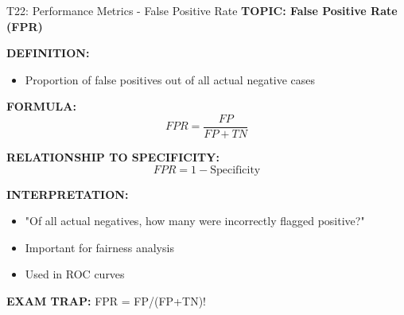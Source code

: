\documentclass[8pt]{beamer}
\begin{document}
	\begin{frame}{T22: Performance Metrics - False Positive Rate}
		\fontsize{6.5}{7.5}\selectfont
		\textbf{TOPIC: False Positive Rate (FPR)}
		
		\vspace{0.1cm}
		\textbf{DEFINITION:}
		\begin{itemize}
			\item Proportion of false positives out of all actual negative cases
		\end{itemize}
		
		\vspace{0.1cm}
		\textbf{FORMULA:}
		\[
		FPR = \frac{FP}{FP+TN}
		\]
		
		\vspace{0.1cm}
		\textbf{RELATIONSHIP TO SPECIFICITY:}
		\[
		FPR = 1 - \text{Specificity}
		\]
		
		\vspace{0.1cm}
		\textbf{INTERPRETATION:}
		\begin{itemize}
			\item "Of all actual negatives, how many were incorrectly flagged positive?"
			\item Important for fairness analysis
			\item Used in ROC curves
		\end{itemize}
		
		\textcolor{myred}{\textbf{EXAM TRAP:}} FPR = \textcolor{myblue}{FP/(FP+TN)}!
	\end{frame}
	
\end{document}
